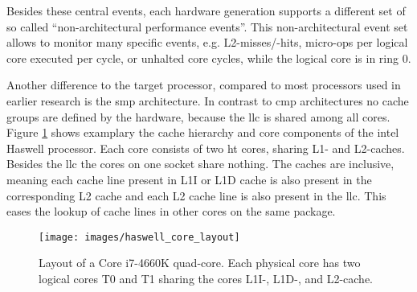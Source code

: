 Besides these central events, each hardware generation supports a different set
of so called ``non-architectural performance events''.
This non-architectural event set allows to monitor many specific events, e.g.
L2-misses/-hits, micro-ops per logical core executed per cycle, or unhalted
core cycles, while the logical core is in ring 0.

Another difference to the target processor, compared to most processors used in
earlier research is the \gls{smp} architecture. In contrast to \gls{cmp}
architectures no cache groups are defined by the hardware, because the
\gls{llc} is shared among all cores.
Figure \ref{state:fig:core_layout} shows examplary the cache hierarchy and core
components of the \gls{intel} Haswell processor.
Each core consists of two \gls{ht} cores, sharing L1- and L2-caches.
Besides the \gls{llc} the cores on one socket share nothing.
The caches are inclusive, meaning each cache line present in L1I or L1D
cache is also present in the corresponding L2 cache and each L2 cache line is
also present in the \gls{llc}.
This eases the lookup of cache lines in other cores on the same package.


\begin{figure}[h!]
  \centering
  \texttt{[image: images/haswell\_core\_layout]}
  \caption{Layout of a Core i7-4660K quad-core.
    Each physical core has two logical cores T0 and T1 sharing the cores L1I-,
    L1D-, and L2-cache.}
  \label{state:fig:core_layout}
\end{figure}

\begin{comment}
\begin{itemize}
  \item diagram of architecture: four cores with L1I/D \& L2 cache; two smt/ht
    cores per physical core; L3 cache shared and sliced, ring buffer for
    access; mem controler in uncore package;
  \item 4 prefetcher per cache; 2 for L1D, 2 for L2 cache
  \item L1D \& L2 cache data is present in L3 cache to be able to redirect
    requests from other cores to the correct cache. --> Issue with security; no
    cache side attack surface reduction
  \item IF security: dual socket system with one core dedicated to security
    tasks for an interval
  \item L3 cache slices corespond to number of cores
  \item logic portion and data array portion; access, coherency, memory
    ordering, LLC misses, writeback to memory; cache lines
  \item hash function uniformly distributes addresses
  \item access times to L3 cache varies depending on travel distance on the
    bi-directional ring buffer
  \item system agent receives memory requests not serviced by cache and
    redirects to IMC
\end{itemize}
\end{comment}

